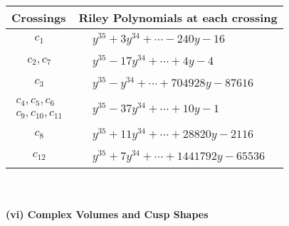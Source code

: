 \documentclass[1p]{elsarticle_modified}
\theoremstyle{definition}
\begin{document}
\begin{tabular}{m{50pt}|m{274pt}}
Crossings & \hspace{64pt}Riley Polynomials at each crossing \\
\hline $$\begin{aligned}c_{1}\end{aligned}$$&$\begin{aligned}
&y^{35}+3 y^{34}+\cdots-240 y-16
\end{aligned}$\\
\hline $$\begin{aligned}c_{2},c_{7}\end{aligned}$$&$\begin{aligned}
&y^{35}-17 y^{34}+\cdots+4 y-4
\end{aligned}$\\
\hline $$\begin{aligned}c_{3}\end{aligned}$$&$\begin{aligned}
&y^{35}- y^{34}+\cdots+704928 y-87616
\end{aligned}$\\
\hline $$\begin{aligned}c_{4},c_{5},c_{6}\\c_{9},c_{10},c_{11}\end{aligned}$$&$\begin{aligned}
&y^{35}-37 y^{34}+\cdots+10 y-1
\end{aligned}$\\
\hline $$\begin{aligned}c_{8}\end{aligned}$$&$\begin{aligned}
&y^{35}+11 y^{34}+\cdots+28820 y-2116
\end{aligned}$\\
\hline $$\begin{aligned}c_{12}\end{aligned}$$&$\begin{aligned}
&y^{35}+7 y^{34}+\cdots+1441792 y-65536
\end{aligned}$\\
\hline
\end{tabular}\\~\\
\newpage\flushleft \textbf{(vi) Complex Volumes and Cusp Shapes}
\end{document}
